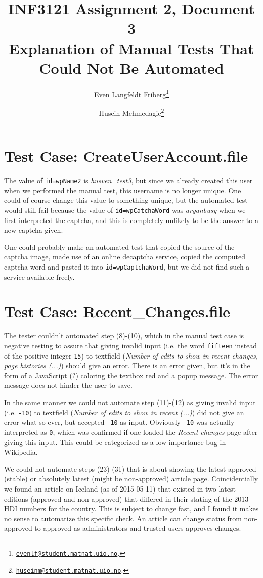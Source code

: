 \documentclass[a4paper,10pt]{article}
\title{INF3121 Assignment 2, Document 3 \\ Explanation of Manual Tests That Could Not Be Automated}
\author{
Even Langfeldt Friberg\footnote{\href{mailto:evenlf@student.matnat.uio.no}{\nolinkurl{evenlf@student.matnat.uio.no}}.}
\and Husein Mehmedagic\footnote{\href{mailto:huseinm@student.matnat.uio.no}{\nolinkurl{huseinm@student.matnat.uio.no}}.}
}
\begin{document}
\maketitle

\section{Test Case: CreateUserAccount.file}
The value of \texttt{id=wpName2} is \textit{husven\_test3}, but since we already created this user when we performed the manual test, this username is 
no longer unique. One could of course 
change this value to something unique, but the automated test would still fail because the value of \texttt{id=wpCatchaWord} was \textit{aryanbusy} when we first 
interpreted the captcha, and this is completely unlikely to be the answer to a new captcha given.

One could probably make an automated test that copied the source of the captcha image, made use of an online decaptcha service, copied the computed captcha word 
and pasted it into \texttt{id=wpCaptchaWord}, but we did not find such a service available freely.

\section{Test Case: Recent\_Changes.file}

The tester couldn't automated step (8)-(10), which in the manual test case is negative testing to assure that giving invalid input (i.e. the word \texttt{fifteen} 
instead of the positive integer \texttt{15}) to textfield (\textit{Number of edits to show in recent changes, page histories (...)}) should give an error. 
There is an error given, but it's in the form of a JavaScript (?) coloring the textbox red and a popup message. The error message does not hinder the user to 
save.

In the same manner we could not automate step (11)-(12) as giving invalid input (i.e. \texttt{-10}) to textfield (\textit{Number of edits to show in recent (...)}) 
did not give an error what so ever, but accepted \texttt{-10} as input. Obviously \texttt{-10} was actually interpreted as \texttt{0}, which was confirmed if 
one loaded the \textit{Recent changes} page after giving this input. This could be categorized as a low-importance bug in Wikipedia.

We could not automate steps (23)-(31) that is about showing the latest approved (stable) or absolutely latest (might be non-approved) article page. Coincidentially we 
found an article on Iceland (as of 2015-05-11) that existed in two latest editions (approved and non-approved) that differed in their stating of the 2013 HDI numbers for the country. This 
is subject to change fast, and I found it makes no sense to automatize this specific check. An article can change status from non-approved to approved as administrators and 
trusted users approves changes.
\end{document}
